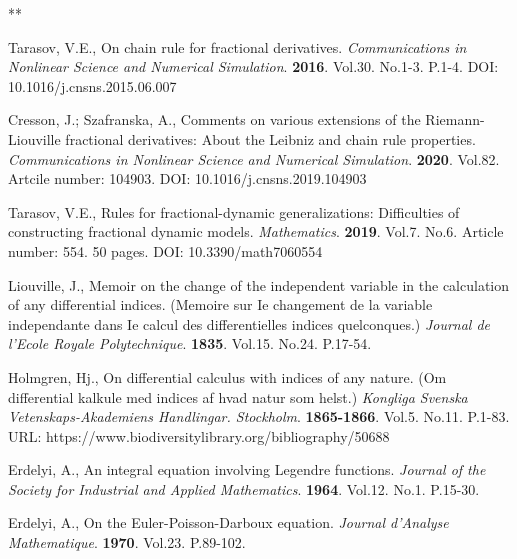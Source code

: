 \documentclass[12pt]{article}
\begin{document}
\begin{thebibliography}{**}

 Tarasov, V.E.,
On chain rule for fractional derivatives.
\textit{Communications in Nonlinear Science and Numerical Simulation}.
\textbf{2016}. Vol.30. No.1-3. P.1-4.
DOI: 10.1016/j.cnsns.2015.06.007

 Cresson, J.; Szafranska, A.,
Comments on various extensions of the Riemann-Liouville fractional derivatives: 
About the Leibniz and chain rule properties.
\textit{Communications in Nonlinear Science and Numerical Simulation}. 
\textbf{2020}. Vol.82. Artcile number: 104903.
DOI: 10.1016/j.cnsns.2019.104903

 Tarasov, V.E., 
Rules for fractional-dynamic generalizations: 
Difficulties of constructing fractional dynamic models. 
\textit{Mathematics}. 
\textbf{2019}. Vol.7. No.6. Article number: 554. 50 pages. 
DOI: 10.3390/math7060554


 Liouville, J., 
Memoir on the change of the independent variable in the calculation of any differential indices.
(Memoire sur Ie changement de la variable independante dans Ie calcul des differentielles indices quelconques.) 
\textit{Journal de l'Ecole Royale Polytechnique}.
\textbf{1835}. Vol.15. No.24. P.17-54. 

 Holmgren, Hj., 
On differential calculus with indices of any nature.
(Om differential kalkule med indices af hvad natur som helst.)
\textit{Kongliga Svenska Vetenskaps-Akademiens Handlingar. Stockholm}. 
\textbf{1865-1866}. Vol.5. No.11. P.1-83.
URL: https://www.biodiversitylibrary.org/bibliography/50688


 Erdelyi, A., 
An integral equation involving Legendre functions. 
\textit{Journal of the Society for Industrial and Applied Mathematics}.
\textbf{1964}. Vol.12. No.1. P.15-30.

 Erdelyi, A., 
On the Euler-Poisson-Darboux equation. 
\textit{Journal d'Analyse Mathematique}. 
\textbf{1970}. Vol.23. P.89-102.


\end{thebibliography}
\end{document}
